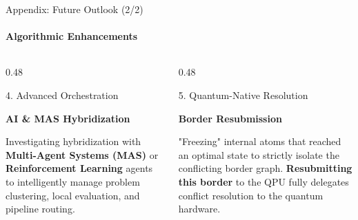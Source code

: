 \documentclass[10pt, aspectratio=169]{beamer}
\begin{document}
\begin{frame}{Appendix: Future Outlook (2/2)}
    \framesubtitle{Algorithmic Enhancements}
    
    \vspace{0.4cm}
    
    \begin{columns}[T]
        
        \begin{column}{0.48\textwidth}
            \begin{block}{4. Advanced Orchestration}
                \begin{minipage}[t][4cm][t]{\linewidth}
                    \centering
                    \vspace{0.3cm}
                    {\Large \textbf{AI \& MAS Hybridization}}\\[0.3cm]
                    \raggedright
                    Investigating hybridization with \textbf{Multi-Agent Systems (MAS)} or \textbf{Reinforcement Learning} agents to intelligently manage problem clustering, local evaluation, and pipeline routing.
                \end{minipage}
            \end{block}
        \end{column}
        
        \begin{column}{0.48\textwidth}
            \begin{block}{5. Quantum-Native Resolution}
                \begin{minipage}[t][4cm][t]{\linewidth}
                    \centering
                    \vspace{0.3cm}
                    {\Large \textbf{Border Resubmission}}\\[0.3cm]
                    \raggedright
                    "Freezing" internal atoms that reached an optimal state to strictly isolate the conflicting border graph. \textbf{Resubmitting this border} to the QPU fully delegates conflict resolution to the quantum hardware.
                \end{minipage}
            \end{block}
        \end{column}
        
    \end{columns}
    
\end{frame}
\end{document}
